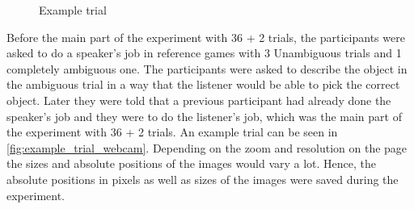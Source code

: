 \begin{figure}
    \centering
    \caption{Example trial}
    \label{fig:example_trial_webcam}
\end{figure}

Before the main part of the experiment with 36 + 2 trials, the participants were asked to do a speaker's job in reference games with 3 Unambiguous trials and 1 completely ambiguous one. The participants were asked to describe the object in the ambiguous trial in a way that the listener would be able to pick the correct object. Later they were told that a previous participant had already done the speaker's job and they were to do the listener's job, which was the main part of the experiment with 36 + 2 trials. An example trial can be seen in \autoref{fig:example_trial_webcam}. Depending on the zoom and resolution on the page the sizes and absolute positions of the images would vary a lot. Hence, the absolute positions in pixels as well as sizes of the images were saved during the experiment. 

